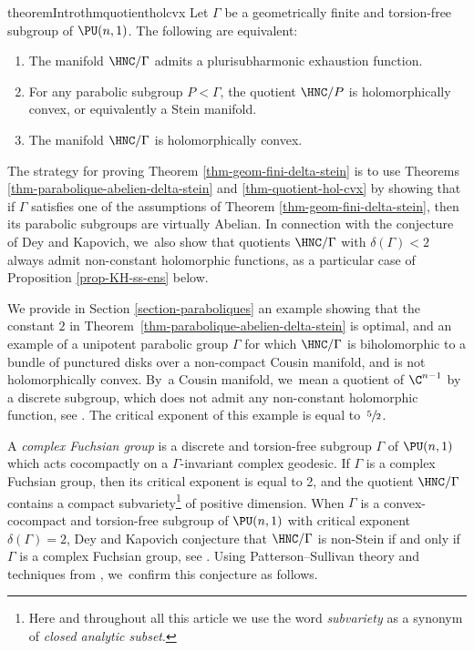 \begin{restatable}{theoremIntro}{thmquotientholcvx}\label{thm-quotient-hol-cvx}
Let $\Gamma$ be a geometrically finite and torsion-free subgroup of $\PU(n,1)$. The following are equivalent: 
\begin{enumerate}
\item\label{thm-quotient-hol-cvx1} The manifold $\HNC/\Gamma$ admits a plurisubharmonic exhaustion function.
\item\label{thm-quotient-hol-cvx2} For any parabolic subgroup $P<\Gamma$, the quotient $\HNC/P$ is holomorphically convex, or equivalently a Stein manifold.
\item\label{thm-quotient-hol-cvx3} The manifold $\HNC/\Gamma$ is holomorphically convex.
\end{enumerate}
\end{restatable}

The strategy for proving Theorem \ref{thm-geom-fini-delta-stein} is to use Theorems \ref{thm-parabolique-abelien-delta-stein} and \ref{thm-quotient-hol-cvx} by showing that if $\Gamma$ satisfies one of the assumptions of Theorem \ref{thm-geom-fini-delta-stein}, then its parabolic subgroups are virtually Abelian. In connection with the conjecture of Dey and Kapovich, we~also show that quotients $\HNC/\Gamma$ with $\delta(\Gamma)<2$ always admit non-constant holomorphic functions, as a particular case of Proposition \ref{prop-KH-ss-ens} below.

We provide in Section \ref{section-paraboliques} an example showing that the constant $2$ in Theorem~\ref{thm-parabolique-abelien-delta-stein} is optimal, and an example of a unipotent parabolic group $\Gamma$ for which $\HNC/\Gamma$ is biholomorphic to a bundle of punctured disks over a non-compact Cousin manifold, and is not holomorphically convex. By~a Cousin manifold, we~mean a quotient of $\C^{n-1}$ by a discrete subgroup, which does not admit any non-constant holomorphic function, see \cite{cousinFonctionsTriplementPeriodiques1910,kopfermannMaximaleUntergruppenAbelscher1964,abeToroidalGroups2001}. The critical exponent of this example is equal to~$\sfrac{5}{2}$.

A \textit{complex Fuchsian group} is a discrete and torsion-free subgroup $\Gamma$ of $\PU(n,1)$ which acts cocompactly on a $\Gamma$\nobreakdash-invariant complex geodesic. If $\Gamma$ is a complex Fuchsian group, then its critical exponent is equal to 2, and the quotient $\HNC/\Gamma$ contains a compact subvariety\footnote{Here and throughout all this article we use the word \textit{subvariety} as a synonym of \textit{closed analytic subset}.} of positive dimension. When $\Gamma$ is a convex-cocompact and torsion-free subgroup of $\PU(n,1)$ with critical exponent $\delta(\Gamma)=2$, Dey and Kapovich conjecture that $\HNC/\Gamma$ is non-Stein if and only if $\Gamma$ is a complex Fuchsian group, see \cite[Conj.\,17]{deyNoteComplexhyperbolicKleinian2020}. Using Patterson--Sullivan theory and techniques from \cite{connellNaturalFlowCritical2023}, we~confirm this conjecture as follows.

